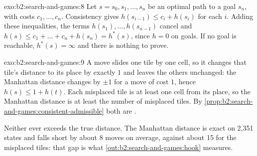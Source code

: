 \begin{solution}{exo:b2:search-and-games:8}
Let $s = s_0, s_1, \dots, s_n$ be an optimal path to a goal $s_n$, with costs $c_1, \dots, c_n$. Consistency gives
$h(s_{i-1}) \leq c_i + h(s_i)$ for each $i$. Adding these inequalities, the terms $h(s_1), \dots, h(s_{n-1})$ cancel and
$h(s) \leq c_1 + \dots + c_n + h(s_n) = h^*(s)$, since $h = 0$ on goals. If no goal is reachable, $h^*(s) = \infty$ and
there is nothing to prove.
\end{solution}

\begin{solution}{exo:b2:search-and-games:9}
A move slides one tile by one cell, so it changes that tile's distance to its place by exactly $1$ and leaves the others
unchanged: the Manhattan distance changes by $\pm 1$ for a move of cost $1$, hence $h(s) \leq 1 + h(t)$. Each misplaced
tile is at least one cell from its place, so the Manhattan distance is at least the number of misplaced tiles. By
\cref{prop:b2:search-and-games:consistent-admissible} both are .

Neither  ever exceeds the true distance. The Manhattan distance is exact on 2,351 states and falls short by about
8 moves on average, against about 15 for the misplaced tiles: that gap is what \cref{out:b2:search-and-games:hook}
measures.
\end{solution}

